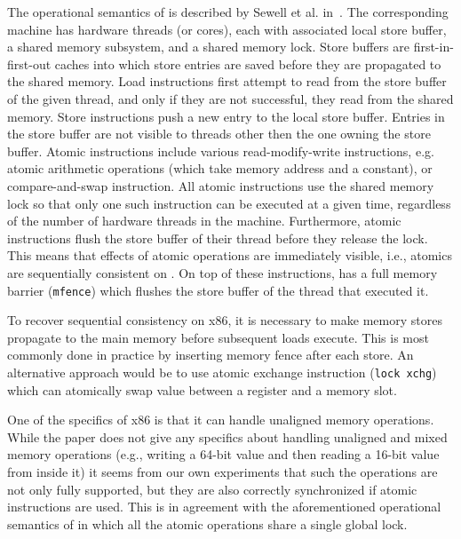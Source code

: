 The operational semantics of \xtso is described by Sewell et al.
in~\cite{x86tso}.
The corresponding machine has hardware threads (or cores), each with associated
local store buffer, a shared memory subsystem, and a shared memory lock.
Store buffers are first-in-first-out caches into which store entries are saved
before they are propagated to the shared memory.
Load instructions first attempt to read from the store buffer of the given
thread, and only if they are not successful, they read from the shared memory.
Store instructions push a new entry to the local store buffer.
Entries in the store buffer are not visible to threads other then the one
owning the store buffer.
Atomic instructions include various read-modify-write instructions, e.g. atomic
arithmetic operations (which take memory address and a constant),
or compare-and-swap instruction.
All atomic instructions use the shared memory lock so that only one such
instruction can be executed at a given time, regardless of the number of
hardware threads in the machine.
Furthermore, atomic instructions flush the store buffer of their thread before
they release the lock.
This means that effects of atomic operations are immediately visible, i.e.,
atomics are sequentially consistent on \xtso.
On top of these instructions, \xtso has a full memory barrier (\texttt{mfence})
which flushes the store buffer of the thread that executed it.

To recover sequential consistency on x86, it is necessary to make memory stores
propagate to the main memory before subsequent loads execute.
This is most commonly done in practice by inserting memory fence after each
store.
An alternative approach would be to use atomic exchange instruction
(\texttt{lock xchg}) which can atomically swap value between a register and a
memory slot.

One of the specifics of x86 is that it can handle unaligned memory
operations.
While the \xtso paper does not give any specifics about handling unaligned and
mixed memory operations (e.g., writing a 64-bit value and then reading a 16-bit
value from inside it) it seems from our own experiments that such the
operations are not only fully supported, but they are also correctly
synchronized if atomic instructions are used.
This is in agreement with the aforementioned operational semantics of \xtso in
which all the atomic operations share a single global lock.

